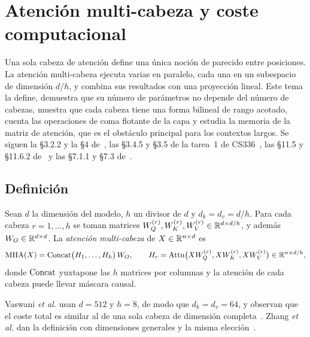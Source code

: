\chapter{Atención multi-cabeza y coste computacional}
\label{tema:4}

Una sola cabeza de atención define una única noción de parecido entre posiciones. La atención multi-cabeza ejecuta varias en paralelo, cada una en un subespacio de dimensión $d/h$, y combina sus resultados con una proyección lineal. Este tema la define, demuestra que su número de parámetros no depende del número de cabezas, muestra que cada cabeza tiene una forma bilineal de rango acotado, cuenta las operaciones de coma flotante de la capa y estudia la memoria de la matriz de atención, que es el obstáculo principal para los contextos largos. Se siguen la §3.2.2 y la §4 de~\cite{vaswani}, las §3.4.5 y §3.5 de la tarea~1 de CS336~\cite{cs336}, las §11.5 y §11.6.2 de~\cite{d2l} y las §7.1.1 y §7.3 de~\cite{jm3}.

\section{Definición}

\begin{definicion}\label{def:mha}
Sean $d$ la dimensión del modelo, $h$ un divisor de $d$ y $d_k=d_v=d/h$. Para cada cabeza $r=1,\dots,h$ se toman matrices $W_{Q}^{(r)},W_{K}^{(r)},W_{V}^{(r)}\in\mathbb{R}^{d\times d/h}$, y además $W_{O}\in\mathbb{R}^{d\times d}$. La \emph{atención multi-cabeza} de $X\in\mathbb{R}^{n\times d}$ es
\[
\operatorname{MHA}(X)=\operatorname{Concat}\bigl(H_1,\dots,H_h\bigr)\,W_{O},\qquad
H_r=\operatorname{Attn}\bigl(XW_{Q}^{(r)},XW_{K}^{(r)},XW_{V}^{(r)}\bigr)\in\mathbb{R}^{n\times d/h},
\]
donde $\operatorname{Concat}$ yuxtapone las $h$ matrices por columnas y la atención de cada cabeza puede llevar máscara causal.
\end{definicion}

Vaswani \emph{et al.} usan $d=512$ y $h=8$, de modo que $d_k=d_v=64$, y observan que el coste total es similar al de una sola cabeza de dimensión completa~\cite[§3.2.2]{vaswani}. Zhang \emph{et al.} dan la definición con dimensiones generales y la misma elección~\cite[§11.5.1]{d2l}.

